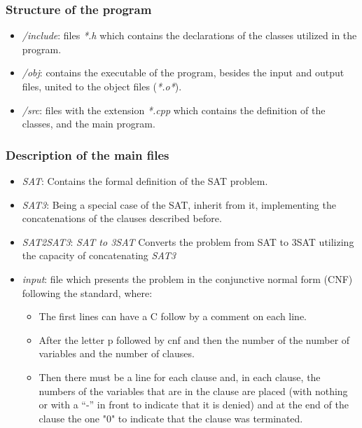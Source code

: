 \documentclass{article}
\begin{document}
\subsubsection{Structure of the program}
\begin{itemize}
    \item \textit{/include}: files \textit{*.h} which contains the declarations of the classes utilized in the program.
    \item \textit{/obj}: contains the executable of the program, besides the input and output files, united to the object files (\textit{*.o*}).
    \item \textit{/src}: files with the extension \textit{*.cpp} which contains the definition of the classes, and the main program.
\end{itemize}

\subsubsection{Description of the main files}
\begin{itemize}
    \item \textit{SAT}: Contains the formal definition of the SAT problem.
    \item \textit{SAT3}: Being a special case of the SAT, inherit from it, implementing the concatenations of the clauses described before.
    \item \textit{SAT2SAT3}: \textit{SAT to 3SAT} Converts the problem from SAT to 3SAT utilizing the capacity of concatenating \de \textit{SAT3}
    \item \textit{input}: file which presents the problem in the conjunctive normal form (CNF) following the standard, where:
    \begin {itemize}
        \item The first lines can have a C follow by a comment on each line.
        \item After the letter p followed by cnf and then the number of the number of variables and the number of clauses.
        \item Then there must be a line for each clause and, in each clause, the numbers of the variables that are in the clause are placed (with nothing or with a “-” in front to indicate that it is denied) and at the end of the clause the one "0" to indicate that the clause was terminated.

    \end{itemize}
\end{itemize}
\end{document}
